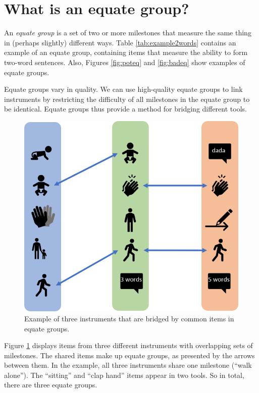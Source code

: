 \documentclass[
]{book}
\begin{document}
\hypertarget{sec:eqdef}{%
\section{What is an equate group?}\label{sec:eqdef}}

An \emph{equate group} is a set of two or more milestones that measure the same thing in (perhaps slightly) different ways. Table \ref{tab:example2words} contains an example of an equate group, containing items that measure the ability to form two-word sentences. Also, Figures \ref{fig:poteq} and \ref{fig:badeq} show examples of equate groups.

Equate groups vary in quality. We can use high-quality equate groups to link instruments by restricting the difficulty of all milestones in the equate group to be identical. Equate groups thus provide a method for bridging different tools.

\begin{figure}

{\centering \includegraphics[width=0.75\linewidth]{fig/equate_ex} 

}

\caption{Example of three instruments that are bridged by common items in equate groups.}\label{fig:equateex}
\end{figure}



Figure \ref{fig:equateex} displays items from three different instruments with overlapping sets of milestones. The shared items make up equate groups, as presented by the arrows between them. In the example, all three instruments share one milestone (``walk alone''). The ``sitting'' and ``clap hand'' items appear in two tools. So in total, there are three equate groups.
\end{document}
